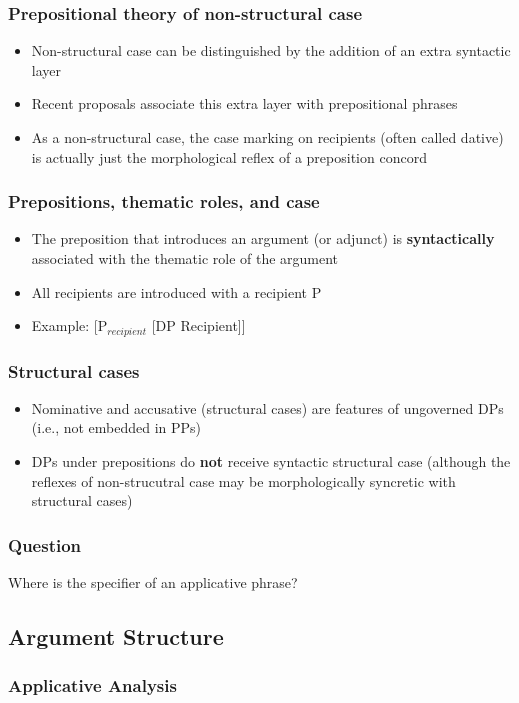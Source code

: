 \documentclass{beamer}
\begin{document}
\begin{frame}
	\frametitle{Prepositional theory of non-structural case}
	\begin{itemize}
		\item Non-structural case can be distinguished by the addition of an extra syntactic layer \citep{Bittner.1996,Bayer.2001}
		\item Recent proposals associate this extra layer with prepositional phrases \citep{Asbury.2005,Asbury.2007,Rezac.2008,Caha.2009}
		\item As a non-structural case, the case marking on recipients (often called dative) is actually just the morphological reflex of a preposition concord
	\end{itemize}
\end{frame}

\begin{frame}
	\frametitle{Prepositions, thematic roles, and case}
	\begin{itemize}
		\item The preposition that introduces an argument (or adjunct) is \textbf{syntactically} associated with the thematic role of the argument
		\item All recipients are introduced with a recipient P
		\item Example: [P$_{recipient}$ [DP Recipient]]
	\end{itemize}
\end{frame}

\begin{frame}
	\frametitle{Structural cases}
	\begin{itemize}
		\item Nominative and accusative (structural cases) are features of ungoverned DPs (i.e., not embedded in PPs)
		\item DPs under prepositions do \textbf{not} receive syntactic structural case (although the reflexes of non-strucutral case may be morphologically syncretic with structural cases)
	\end{itemize}
\end{frame}

\begin{frame}
	\frametitle{Question}
	\vfill
	\Large
	Where is the specifier of an applicative phrase?
	\vfill
\end{frame}
\subsection{Argument Structure}
\begin{frame}
	\frametitle{Applicative Analysis}
\end{frame}
\end{document}
